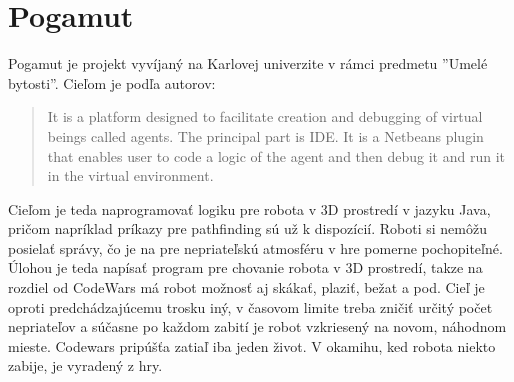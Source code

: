 \section {Pogamut}
Pogamut je projekt vyvíjaný na Karlovej univerzite v rámci predmetu ''Umelé bytosti''\cite{umByt}. Cieľom je podľa autorov\cite{pogamut}:\\
\begin{quote}It is a platform designed to facilitate creation and debugging of virtual beings called agents. The principal part is IDE. It is a Netbeans plugin that enables user to code a logic of the agent and then debug it and run it in the virtual environment.
\end{quote}
Cieľom je teda naprogramovať logiku pre robota v 3D prostredí v jazyku Java, pričom napríklad príkazy pre pathfinding sú už k dispozícií. Roboti si nemôžu posielať správy, čo je na pre nepriateľskú atmosféru v hre pomerne pochopiteľné. Úlohou je teda napísať program pre chovanie robota v 3D prostredí, takze na rozdiel od CodeWars má robot možnosť aj skákať, plaziť, bežat a pod. Cieľ je oproti predchádzajúcemu trosku iný, v časovom limite treba zničiť určitý počet nepriateľov a súčasne po každom zabití je robot vzkriesený na novom, náhodnom mieste. Codewars pripúšťa zatiaľ iba jeden život. V okamihu, ked robota niekto zabije, je vyradený z hry.%
